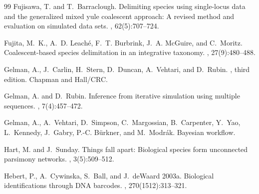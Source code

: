\documentclass[12pt]{article}
\begin{document}
\begin{thebibliography}{99}
Fujisawa, T. and T.~Barraclough\leavevmode\nopagebreak{}.
\newblock Delimiting species using single-locus data and the generalized mixed
  yule coalescent approach: A revised method and evaluation on simulated data
  sets.
, 62(5):707--724.

Fujita, M.~K., A.~D. Leaché, F.~T. Burbrink, J.~A. McGuire, and
  C.~Moritz\leavevmode\nopagebreak{}.
\newblock Coalescent-based species delimitation in an integrative taxonomy.
, 27(9):480--488.

Gelman, A., J.~Carlin, H.~Stern, D.~Duncan, A.~Vehtari, and
  D.~Rubin\leavevmode\nopagebreak{}.
, third edition.
\newblock Chapman and Hall/CRC.

Gelman, A. and D.~Rubin\leavevmode\nopagebreak{}.
\newblock Inference from iterative simulation using multiple sequences.
, 7(4):457--472.

Gelman, A., A.~Vehtari, D.~Simpson, C.~Margossian, B.~Carpenter, Y.~Yao,
  L.~Kennedy, J.~Gabry, P.-C. Bürkner, and
  M.~Modrák\leavevmode\nopagebreak{}.
\newblock Bayesian workflow.

Hart, M. and J.~Sunday\leavevmode\nopagebreak{}.
\newblock Things fall apart: {B}iological species form unconnected parsimony
  networks.
, 3(5):509--512.

Hebert, P., A.~Cywinska, S.~Ball, and J.~deWaard\leavevmode\nopagebreak\newline
  2003a.
\newblock Biological identifications through {DNA} barcodes.
, 270(1512):313--321.


\end{thebibliography}
\end{document}
